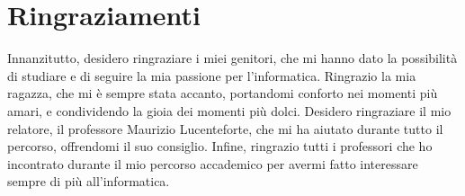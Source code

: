 \chapter*{Ringraziamenti}

Innanzitutto, desidero ringraziare i miei genitori, che mi hanno dato la
possibilità di studiare e di seguire la mia passione per l'informatica.
Ringrazio la mia ragazza, che mi è sempre stata accanto, portandomi
conforto nei momenti più amari, e condividendo la gioia dei momenti più dolci.
Desidero ringraziare il mio relatore, il professore Maurizio Lucenteforte,
che mi ha aiutato durante tutto il percorso, offrendomi il suo consiglio.
Infine, ringrazio tutti i professori che ho incontrato durante il mio percorso
accademico per avermi fatto interessare sempre di più all'informatica.
